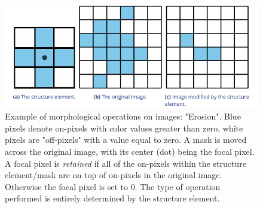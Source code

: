 \documentclass[9pt,lineno]{elife}
\begin{document}
\begin{figure}[t]
    \centering
    \includegraphics[width=\textwidth]{fig_structure_elements.pdf}
    \caption{Example of morphological operations on images: "Erosion". Blue pixels denote on-pixels with color values greater than zero, white pixels are "off-pixels" with a value equal to zero. A mask is moved across the original image, with its center (dot) being the focal pixel. A focal pixel is \textit{retained} if all of the on-pixels within the structure element/mask are on top of on-pixels in the original image. Otherwise the focal pixel is set to 0. The type of operation performed is entirely determined by the structure element.}
	\label{fig:erosion}
\end{figure}
\end{document}
